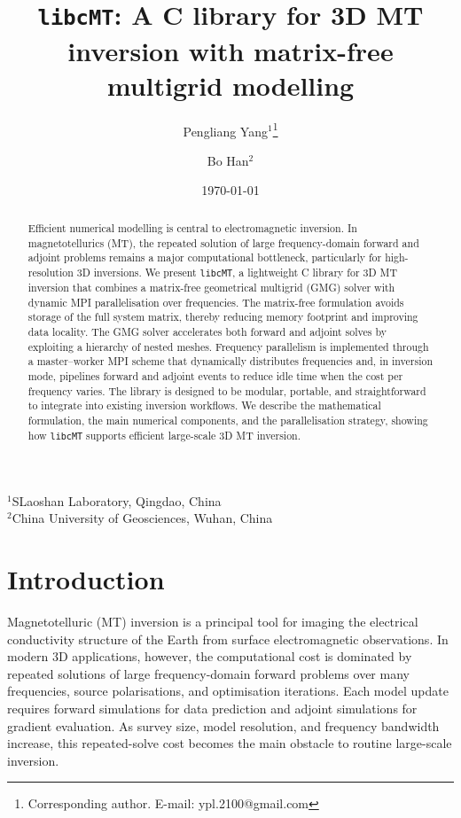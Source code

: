 \documentclass{article}
\begin{document}
\title{\texttt{libcMT}: A C library for 3D MT inversion with matrix-free multigrid modelling}

\author{
  Pengliang Yang$^{1}$\thanks{Corresponding author. E-mail: ypl.2100@gmail.com} \and
  Bo Han$^{2}$ 
}
\date{\today}

\maketitle

\begin{center}
  \footnotesize
  $^{1}$SLaoshan Laboratory, Qingdao, China\\
  $^{2}$China University of Geosciences, Wuhan, China
\end{center}

\begin{abstract}
Efficient numerical modelling is central to electromagnetic inversion. In magnetotellurics (MT), the repeated solution of large frequency-domain forward and adjoint problems remains a major computational bottleneck, particularly for high-resolution 3D inversions. We present \texttt{libcMT}, a lightweight C library for 3D MT inversion that combines a matrix-free geometrical multigrid (GMG) solver with dynamic MPI parallelisation over frequencies. The matrix-free formulation avoids storage of the full system matrix, thereby reducing memory footprint and improving data locality. The GMG solver accelerates both forward and adjoint solves by exploiting a hierarchy of nested meshes. Frequency parallelism is implemented through a master--worker MPI scheme that dynamically distributes frequencies and, in inversion mode, pipelines forward and adjoint events to reduce idle time when the cost per frequency varies. The library is designed to be modular, portable, and straightforward to integrate into existing inversion workflows. We describe the mathematical formulation, the main numerical components, and the parallelisation strategy, showing how \texttt{libcMT} supports efficient large-scale 3D MT inversion.
\end{abstract}

\section{Introduction}

Magnetotelluric (MT) inversion is a principal tool for imaging the electrical conductivity structure of the Earth from surface electromagnetic observations. In modern 3D applications, however, the computational cost is dominated by repeated solutions of large frequency-domain forward problems over many frequencies, source polarisations, and optimisation iterations. Each model update requires forward simulations for data prediction and adjoint simulations for gradient evaluation. As survey size, model resolution, and frequency bandwidth increase, this repeated-solve cost becomes the main obstacle to routine large-scale inversion.
\end{document}
